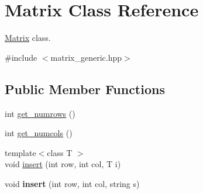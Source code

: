 \hypertarget{classMatrix}{\section{Matrix Class Reference}
\label{classMatrix}
}


\hyperlink{classMatrix}{Matrix} class.  




{\ttfamily \#include $<$matrix\-\_\-generic.\-hpp$>$}

\subsection*{Public Member Functions}
\begin{DoxyCompactItemize}
\item 
int \hyperlink{classMatrix_a84a3a832190ea28115b32455ec87af32}{get\-\_\-numrows} ()
\item 
int \hyperlink{classMatrix_a73eab90ba7be05e4aca5957e9f993cec}{get\-\_\-numcols} ()
\item 
{\footnotesize template$<$class T $>$ }\\void \hyperlink{classMatrix_a981737cbf6dc470fb0a5daa2ca484c1e}{insert} (int row, int col, T i)
\item 
\hypertarget{classMatrix_a9892e385c96e95ea060bb8e54692912a}{void {\bfseries insert} (int row, int col, string s)}\label{classMatrix_a9892e385c96e95ea060bb8e54692912a}


\end{DoxyCompactItemize}
